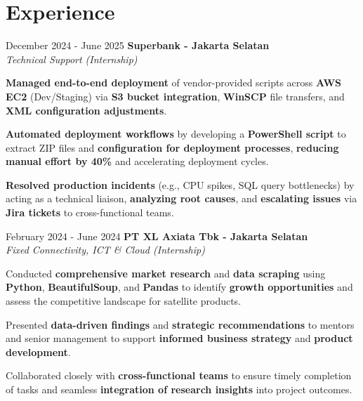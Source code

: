 \documentclass[../main.tex]{subfiles}
\begin{document}
\section{Experience}

\begin{twocolentry}{December 2024 - June 2025}
    \textbf{Superbank \color{Gray}- Jakarta Selatan}\\
    \textit{Technical Support (Internship)}
\end{twocolentry}

\vspace{0.10 cm}
\begin{onecolentry}
\begin{highlights}
    \item \textbf{Managed end-to-end deployment} of vendor-provided scripts across \textbf{AWS EC2} (Dev/Staging) via \textbf{S3 bucket integration}, \textbf{WinSCP} file transfers, and \textbf{XML configuration adjustments}.
    \item \textbf{Automated deployment workflows} by developing a \textbf{PowerShell script} to extract ZIP files and \textbf{configuration for deployment processes}, \textbf{reducing manual effort by 40\%} and accelerating deployment cycles.
    \item \textbf{Resolved production incidents} (e.g., CPU spikes, SQL query bottlenecks) by acting as a technical liaison, \textbf{analyzing root causes}, and \textbf{escalating issues} via \textbf{Jira tickets} to cross-functional teams.
\end{highlights}
\end{onecolentry}

\vspace{0.40 cm}

\begin{twocolentry}{February 2024 - June 2024}
    \textbf{PT XL Axiata Tbk \color{Gray}- Jakarta Selatan}\\
    \textit{Fixed Connectivity, ICT \& Cloud (Internship)}
\end{twocolentry}

\vspace{0.10 cm}
\begin{onecolentry}
\begin{highlights}
    \item Conducted \textbf{comprehensive market research} and \textbf{data scraping} using \textbf{Python}, \textbf{BeautifulSoup}, and \textbf{Pandas} to identify \textbf{growth opportunities} and assess the competitive landscape for satellite products.
    \item Presented \textbf{data-driven findings} and \textbf{strategic recommendations} to mentors and senior management to support \textbf{informed business strategy} and \textbf{product development}.
    \item Collaborated closely with \textbf{cross-functional teams} to ensure timely completion of tasks and seamless \textbf{integration of research insights} into project outcomes.
\end{highlights}
\end{onecolentry}
\end{document}
